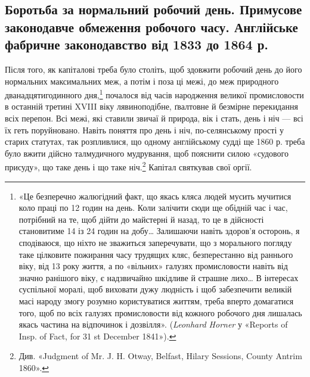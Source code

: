 
\subsection{Боротьба за нормальний робочий день. Примусове законодавче
обмеження робочого часу. Англійське фабричне законодавство
від 1833 до 1864 р.}

Після того, як капіталові треба було століть, щоб здовжити
робочий день до його нормальних максимальних меж, а потім і
поза ці межі, до меж природного дванадцятигодинного дня,\footnote{
«Це безперечно жалюгідний факт, що якась кляса людей мусить
мучитися коло праці по 12 годин на день. Коли залічити сюди ще обідній
час і час, потрібний на те, щоб дійти до майстерні й назад, то це в дійсності
становитиме 14 із 24 годин на добу\dots{} Залишаючи навіть здоров’я осторонь,
я сподіваюся, що ніхто не зважиться заперечувати, що з морального
погляду таке цілковите пожирання часу трудящих кляс, безперестанно
від раннього віку, від 13 року життя, а по «вільних» галузях промисловости
навіть від значно ранішого віку, є надзвичайно шкідливе й страшне
лихо\dots{} В інтересах суспільної моралі, щоб виховати дужу людність
і щоб забезпечити великій масі народу змогу розумно користуватися
життям, треба вперто домагатися того, щоб по всіх галузях промисловости
від кожного робочого дня лишалась якась частина на відпочинок і дозвілля».
(\emph{Leonhard Horner} у «Reports of Insp. of Fact, for 31 st December
1841»).
}
почалося від часів народження великої промисловости в останній
третині XVIII віку лявиноподібне, ґвалтовне й безмірне перекидання
всіх перепон. Всі межі, які ставили звичаї й природа,
вік і стать, день і ніч — всі їх геть поруйновано. Навіть поняття
про день і ніч, по-селянському прості у старих статутах, так
розпливлися, що одному англійському судді ще 1860 р. треба
було вжити дійсно талмудичного мудрування, щоб пояснити
силою «судового присуду», що таке день і що таке ніч.\footnote{
Див. «Judgment of Mr. J. H. Otway, Belfast, Hilary Sessions,
County Antrim 1860».
} Капітал святкував свої оргії.


